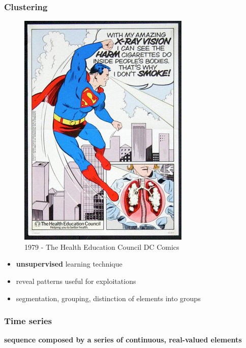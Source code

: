 \documentclass[11pt]{article}
\begin{document}
\subsubsection*{Clustering}
\label{sec:org4ee1ec0}
\begin{figure}[htbp]
\centering
\includegraphics[width=.9\linewidth]{./img/xray_vision.jpg}
\caption{1979 - The Health Education Council DC Comics}
\end{figure}
\begin{itemize}
\item \textbf{unsupervised} learning technique
\item reveal patterns useful for exploitations
\item segmentation, grouping, distinction of elements into groups
\end{itemize}
\subsubsection*{Time series}
\label{sec:org0133cdf}
\textbf{sequence composed by a series of continuous, real-valued elements}
\end{document}
